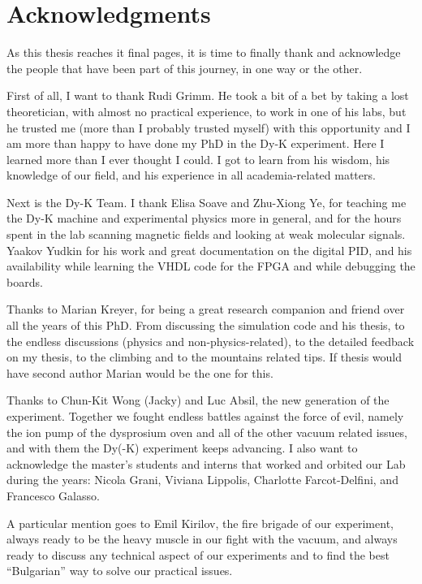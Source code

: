 \chapter*{Acknowledgments}

As this thesis reaches it final pages, it is time to finally thank and acknowledge the people that have been part of this journey, in one way or the other. 

First of all, I want to thank Rudi Grimm. He took a bit of a bet by taking a lost theoretician, with almost no practical experience, to work in one of his labs, but he trusted me (more than I probably trusted myself) with this opportunity and I am more than happy to have done my PhD in the Dy-K experiment. Here I learned more than I ever thought I could. I got to learn from his wisdom, his knowledge of our field, and his experience in all academia-related matters.


Next is the Dy-K Team. I thank Elisa Soave and Zhu-Xiong Ye, for teaching me the Dy-K machine and experimental physics more in general, and for the hours spent in the lab scanning magnetic fields and looking at weak molecular signals. Yaakov Yudkin for his work and great documentation on the digital PID, and his availability while learning the VHDL code for the FPGA and while debugging the boards. 

Thanks to Marian Kreyer, for being a great research companion and friend over all the years of this PhD. From discussing the simulation code and his thesis, to the endless discussions (physics and non-physics-related), to the detailed feedback on my thesis, to the climbing and to the mountains related tips. If thesis would have second author Marian would be the one for this. 

Thanks to Chun-Kit Wong (Jacky) and Luc Absil, the new generation of the experiment. Together we fought endless battles against the force of evil, namely the ion pump of the dysprosium oven and all of the other vacuum related issues, and with them the Dy(-K) experiment keeps advancing. I  also want to acknowledge the master's students and interns that worked and orbited our Lab during the years: Nicola Grani,  Viviana Lippolis, Charlotte Farcot-Delfini, and Francesco Galasso.

A particular mention goes to Emil Kirilov, the fire brigade of our experiment, always ready to be the heavy muscle in our fight with the vacuum, and always ready to discuss any technical aspect of our experiments and to find the best ``Bulgarian'' way to solve our practical issues.

